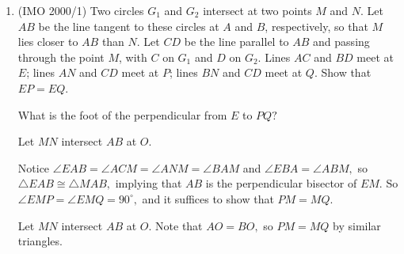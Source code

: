 \begin{enumerate}
    \item (IMO 2000/1) Two circles $G_1$ and $G_2$ intersect at two points $M$ and $N$. Let $AB$ be the line tangent to these circles at $A$ and $B$, respectively, so that $M$ lies closer to $AB$ than $N$. Let $CD$ be the line parallel to $AB$ and passing through the point $M$, with $C$ on $G_1$ and $D$ on $G_2$. Lines $AC$ and $BD$ meet at $E$; lines $AN$ and $CD$ meet at $P$; lines $BN$ and $CD$ meet at $Q$. Show that $EP=EQ$.
\begin{hint}
\begin{addhint}
{What is the foot of the perpendicular from $E$ to $PQ?$}
\end{addhint}
\begin{addhint}
{Let $MN$ intersect $AB$ at $O.$}
\end{addhint}
\end{hint}
\begin{solu}
\begin{addsol}
{Notice $\angle EAB=\angle ACM=\angle ANM=\angle BAM$ and $\angle EBA=\angle ABM,$ so $\triangle EAB\cong \triangle MAB,$ implying that $AB$ is the perpendicular bisector of $EM.$ So $\angle EMP=\angle EMQ=90^{\circ},$ and it suffices to show that $PM=MQ.$

Let $MN$ intersect $AB$ at $O.$ Note that $AO=BO,$ so $PM=MQ$ by similar triangles.}
\end{addsol}
\end{solu}
\end{enumerate}